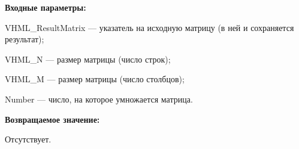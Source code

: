 \textbf{Входные параметры:}

 VHML\_ResultMatrix --- указатель на исходную матрицу (в ней и сохраняется результат);
 
 VHML\_N --- размер матрицы (число строк);
 
 VHML\_M --- размер матрицы (число столбцов);
 
 Number --- число, на которое умножается матрица.

\textbf{Возвращаемое значение:}

Отсутствует.